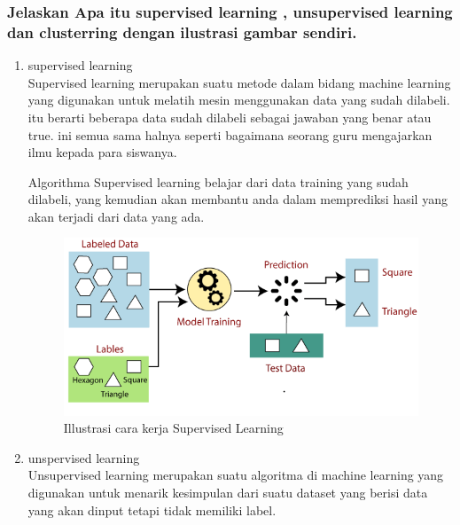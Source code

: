 \subsubsection{Jelaskan Apa itu supervised learning , unsupervised learning dan clusterring dengan ilustrasi gambar sendiri.}
\begin{enumerate}
\item supervised learning
\hfill\\
Supervised learning merupakan suatu metode dalam bidang machine learning yang digunakan untuk melatih mesin menggunakan data yang sudah dilabeli. itu berarti beberapa data sudah dilabeli sebagai jawaban yang benar atau true. ini semua sama halnya seperti bagaimana seorang guru mengajarkan ilmu kepada para siswanya.

Algorithma Supervised learning belajar dari data training yang sudah dilabeli, yang kemudian akan membantu anda dalam memprediksi hasil yang akan terjadi dari data yang ada.
\begin{figure}[H]
    \includegraphics[width=12cm]{figures/1174079/2/supervisedmachinelearning.png}
    \centering
    \caption{Illustrasi cara kerja Supervised Learning}
\end{figure}

\item unspervised learning
\hfill\\
Unsupervised learning merupakan suatu algoritma di machine learning yang digunakan untuk menarik kesimpulan dari suatu dataset yang berisi data yang akan dinput tetapi tidak memiliki label.


\end{enumerate}
